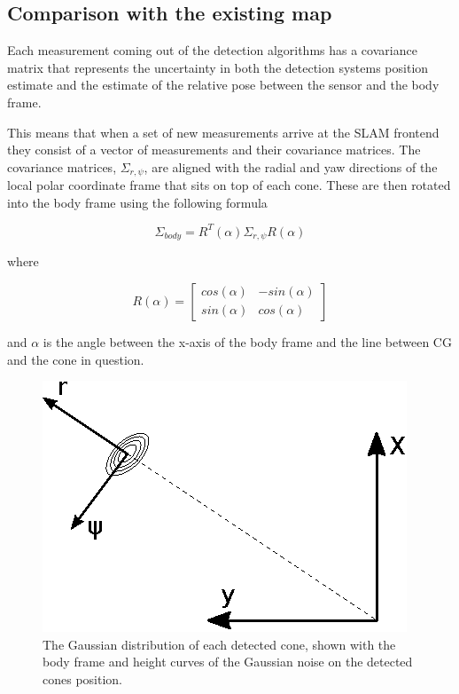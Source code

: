 \subsection{Comparison with the existing map}

Each measurement coming out of the detection algorithms has a covariance matrix that represents the uncertainty in both the detection systems position estimate and the estimate of the relative pose between the sensor and the body frame.

This means that when a set of new measurements arrive at the \gls{SLAM} frontend they consist of a vector of measurements and their covariance matrices. The covariance matrices, $\Sigma_{r,\psi}$, are aligned with the radial and yaw directions of the local polar coordinate frame that sits on top of each cone. These are then rotated into the body frame using the following formula

\begin{equation}
    \Sigma_{body} = R^T(\alpha)\Sigma_{r,\psi}R(\alpha)
    \label{DetectToBodyRot}
\end{equation}

where 

\begin{equation}
    R(\alpha) = \begin{bmatrix} cos(\alpha) & -sin(\alpha) \\ sin(\alpha) & cos(\alpha)
    \end{bmatrix}
\end{equation} 

and $\alpha$ is the angle between the x-axis of the body frame and the line between \gls{CG} and the cone in question. 

\begin{figure}
    \centering
    \includegraphics[width=0.5\linewidth]{0_Images/3_Theory/DetectionFrame.eps}
    \caption[The Gaussian distribution of each detected cone.]{The Gaussian distribution of each detected cone, shown with the body frame and height curves of the Gaussian noise on the detected cones position.}
    \label{Fig:DetectionFrame}
\end{figure}

